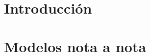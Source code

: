 \documentclass[a4paper,11pt]{book}
\theoremstyle{definition} \newtheorem{axiom}{Axioma}
\begin{document}


\newcommand{\Nat}{\mathbb{N}}
\newcommand{\IM}[1]{\underline{#1}}
\newcommand{\cita}{\textcolor{red}{cita}}
\newcommand{\alert}[1]{\footnote{\textcolor{red}{#1}}}
\newcommand{\red}[1]{\textcolor{red}{#1}}

\newcommand{\mycomment}[1]{\textcolor{blue}{#1}\newline}
\theoremstyle{definition} \newtheorem{definition}{Definici'on}


\newcommand{\defaultAlignment}{center}
\newcommand{\defaultWidth}{12.5cm}
\newenvironment{imagen}{
\let\File\empty
\let\Desc\empty
\let\LabelName\empty
\let\Width\defaultWidth
\let\Alignment\defaultAlignment
}{
    \begin{figure}[!h]
    \begin{\Alignment}
    \texttt{[image: \\File]}
    \caption{\Desc}
    \label{\LabelName}
    \end{\Alignment}
    \end{figure}

}

\newcommand{\file}[1]{\def\File{#1}}
\newcommand{\desc}[1]{\def\Desc{#1}}
\newcommand{\labelname}[1]{\def\LabelName{#1}}
\newcommand{\width}[1]{\def\Width{#1}}
\newcommand{\alignment}[1]{\def\Alignment{#1}}



\frontmatter

%

%
%
%
%
%

\setlength{\parskip}{0ex plus 0.5ex minus 0.2ex}
\tableofcontents

\mainmatter
\fancyhead[LO]{\leftmark}


\chapter{Introducci\'on}





\chapter{Modelos nota a nota}





\end{document}
